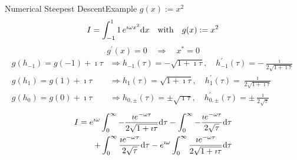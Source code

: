 \documentclass{beamer}
\begin{document}
\begin{frame}{Numerical Steepest Descent}{Example $g(x) := x^2$}
  \vspace{-0.5cm}
  \begin{equation*}
    I = \int_{-1}^{1} 1\, e^{\imath \omega x^2} \mathrm{d}x
    \quad \text{with} \quad
    g(x) := x^2
  \end{equation*}
  \begin{equation*}
    g^{\prime}(x) = 0 \quad \Rightarrow \quad x^{*} = 0
  \end{equation*}
  \begin{equation*}
    \begin{split}
    g(h_{-1}) = g(-1) + \imath \tau   & \Rightarrow
    h_{-1}(\tau) = -\sqrt{1+\imath\tau}, \quad
    h_{-1}^{\prime}(\tau) = -\frac{\imath}{2\sqrt{1+\imath\tau}} \\
    g(h_{1}) = g(1) + \imath \tau   & \Rightarrow
    h_{1}(\tau) = \sqrt{1+\imath\tau}, \quad
    h_{1}^{\prime}(\tau) = \frac{\imath}{2\sqrt{1+\imath\tau}} \\
    g(h_{0}) = g(0) + \imath \tau   & \Rightarrow
    h_{0,\pm}(\tau) = \pm\sqrt{\imath\tau}, \quad
    h_{0,\pm}^{\prime}(\tau) = \pm\frac{\imath}{2\sqrt{\tau}}
    \end{split}
  \end{equation*}
  \begin{equation*}
    \begin{split}
      I = e^{\imath\omega} \int_0^\infty -\frac{\imath e^{-\omega\tau}}{2\sqrt{1+\imath\tau}} \mathrm{d}\tau
      - \int_0^\infty -\frac{\imath e^{-\omega\tau}}{2\sqrt{\tau}} \mathrm{d}\tau \\
      + \int_0^\infty  \frac{\imath e^{-\omega\tau}}{2\sqrt{\tau}} \mathrm{d}\tau
    - e^{\imath\omega} \int_0^\infty \frac{\imath e^{-\omega\tau}}{2\sqrt{1+\imath\tau}} \mathrm{d}\tau
    \end{split}
  \end{equation*}
\end{frame}


\end{document}
